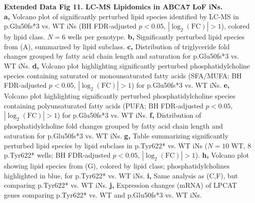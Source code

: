 \textbf{Extended Data Fig 11. LC-MS Lipidomics in ABCA7 LoF iNs.}\\
\textbf{a,} Volcano plot of significantly perturbed lipid species identified by LC-MS in p.Glu50fs*3 vs. WT iNs (BH FDR-adjusted $p<0.05$, $|\log_2(\text{FC})|>1$), colored by lipid class. $N=6$ wells per genotype.
\textbf{b,} Significantly perturbed lipid species from (A), summarized by lipid subclass.
\textbf{c,} Distribution of triglyceride fold changes grouped by fatty acid chain length and saturation for p.Glu50fs*3 vs. WT iNs.
\textbf{d,} Volcano plot highlighting significantly perturbed phosphatidylcholine species containing saturated or monounsaturated fatty acids (SFA/MUFA; BH FDR-adjusted $p<0.05$, $|\log_2(\text{FC})|>1$) for p.Glu50fs*3 vs. WT iNs.
\textbf{e,} Volcano plot highlighting significantly perturbed phosphatidylcholine species containing polyunsaturated fatty acids (PUFA; BH FDR-adjusted $p<0.05$, $|\log_2(\text{FC})|>1$) for p.Glu50fs*3 vs. WT iNs.
\textbf{f,} Distribution of phosphatidylcholine fold changes grouped by fatty acid chain length and saturation for p.Glu50fs*3 vs. WT iNs.
\textbf{g,} Table summarizing significantly perturbed lipid species by lipid subclass in p.Tyr622* vs. WT iNs ($N=10$ WT, $8$ p.Tyr622* wells; BH FDR-adjusted $p<0.05$, $|\log_2(\text{FC})|>1$).
\textbf{h,} Volcano plot showing lipid species from (G), colored by lipid class; phosphatidylcholines highlighted in blue, for p.Tyr622* vs. WT iNs.
\textbf{i,} Same analysis as (C,F), but comparing p.Tyr622* vs. WT iNs.
\textbf{j,} Expression changes (mRNA) of LPCAT genes comparing p.Tyr622* vs. WT and p.Glu50fs*3 vs. WT iNs.

